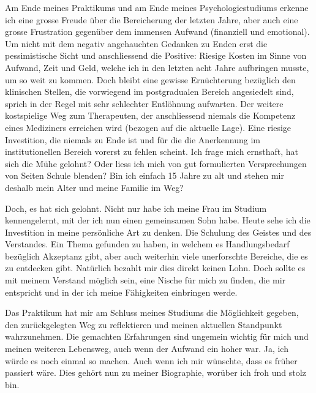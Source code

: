 Am Ende meines Praktikums und am Ende meines Psychologiestudiums erkenne ich eine grosse Freude über die Bereicherung der letzten Jahre, aber auch eine grosse Frustration gegenüber dem immensen Aufwand (finanziell und emotional). Um nicht mit dem negativ angehauchten Gedanken zu Enden erst die pessimistische Sicht und anschliessend die Positive: Riesige Kosten im Sinne von Aufwand, Zeit und Geld, welche ich in den letzten acht Jahre aufbringen musste, um so weit zu kommen. Doch bleibt eine gewisse Ernüchterung bezüglich den klinischen Stellen, die vorwiegend im postgradualen Bereich angesiedelt sind, sprich in der Regel mit sehr schlechter Entlöhnung aufwarten. Der weitere kostspielige Weg zum Therapeuten, der anschliessend niemals die Kompetenz eines Mediziners erreichen wird (bezogen auf die aktuelle Lage). Eine riesige Investition, die niemals zu Ende ist und für die die Anerkennung im institutionellen Bereich vorerst zu fehlen scheint. Ich frage mich ernsthaft, hat sich die Mühe gelohnt? Oder liess ich mich von gut formulierten Versprechungen von Seiten Schule blenden? Bin ich einfach 15 Jahre zu alt und stehen mir deshalb mein Alter und meine Familie im Weg? 

Doch, es hat sich gelohnt. Nicht nur habe ich meine Frau im Studium kennengelernt, mit der ich nun einen gemeinsamen Sohn habe. Heute sehe ich die Investition in meine persönliche Art zu denken. Die Schulung des Geistes und des Verstandes. Ein Thema gefunden zu haben, in welchem es Handlungsbedarf bezüglich Akzeptanz gibt, aber auch weiterhin viele unerforschte Bereiche, die es zu entdecken gibt. Natürlich bezahlt mir dies direkt keinen Lohn. Doch sollte es mit meinem Verstand möglich sein, eine Nische für mich zu finden, die mir entspricht und in der ich meine Fähigkeiten einbringen werde. 

Das Praktikum hat mir am Schluss meines Studiums die Möglichkeit gegeben, den zurückgelegten Weg zu reflektieren und meinen aktuellen Standpunkt wahrzunehmen. Die gemachten Erfahrungen sind ungemein wichtig für mich und meinen weiteren Lebensweg, auch wenn der Aufwand ein hoher war. Ja, ich würde es noch einmal so machen. Auch wenn ich mir wünschte, dass es früher passiert wäre. Dies gehört nun zu meiner Biographie, worüber ich froh und stolz bin.

